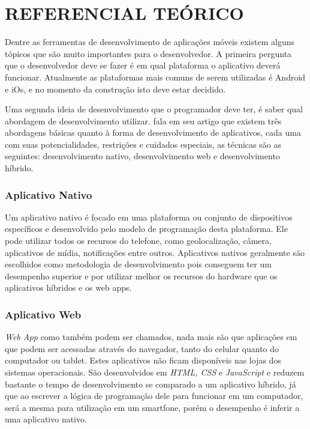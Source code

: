 
\chapter{REFERENCIAL TEÓRICO}
\label{chap:ref_teo}


Dentre as ferramentas de desenvolvimento de aplicações móveis existem alguns tópicos que são muito importantes para o desenvolvedor. A primeira pergunta que o desenvolvedor deve se fazer é em qual plataforma o aplicativo deverá funcionar. Atualmente as plataformas mais comuns de serem utilizadas é Android e iOs, e no momento da construção isto deve estar decidido.

Uma segunda ideia de desenvolvimento que o programador deve ter, é saber qual abordagem de desenvolvimento utilizar.
\cite{apps} fala em seu artigo que existem três abordagens básicas quanto à forma de desenvolvimento de aplicativos, cada uma com suas potencialidades, restrições e cuidados especiais, as técnicas são as seguintes: desenvolvimento nativo, desenvolvimento web e desenvolvimento híbrido.

\subsection{Aplicativo Nativo}
Um aplicativo nativo é focado em uma plataforma ou conjunto de dispositivos específicos e desenvolvido pelo modelo de programação desta plataforma. Ele pode utilizar todos os recursos do telefone, como geolocalização, câmera, aplicativos de mídia, notificações entre outros. Aplicativos nativos geralmente são escolhidos como metodologia de desenvolvimento pois conseguem ter um desempenho superior e por utilizar melhor os recursos do hardware que os aplicativos híbridos e os web apps.


\subsection{Aplicativo Web}
\textit{Web App} como também podem ser chamados, nada mais são que aplicações em que podem ser acessadas através do navegador, tanto do celular quanto do computador ou tablet. Estes aplicativos não ficam disponíveis nas lojas dos sistemas operacionais. São desenvolvidos em \textit{HTML, CSS} e \textit{JavaScript} e reduzem bastante o tempo de desenvolvimento se comparado a um aplicativo híbrido, já que ao escrever a lógica de programação dele para funcionar em um computador, será a mesma para utilização em um smartfone, porém o desempenho é inferir a uma aplicativo nativo.

